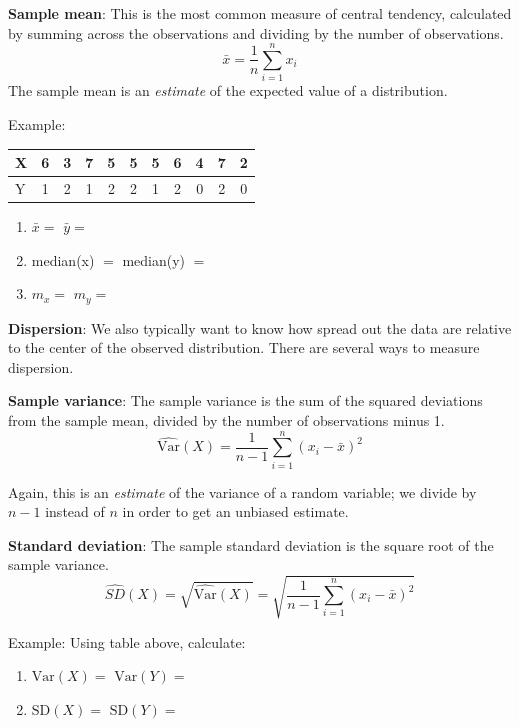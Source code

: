 \documentclass[
]{book}
\newcommand{\SD}{\mathrm{SD}}
\theoremstyle{definition}
\theoremstyle{definition}
\theoremstyle{definition}
\theoremstyle{definition}
\theoremstyle{remark}
\begin{document}
\textbf{Sample mean}: This is the most common measure of central tendency, calculated by summing across the observations and dividing by the number of observations.
\[\bar{x} = \frac{1}{n}\sum_{i=1}^{n}x_i\]
The sample mean is an \emph{estimate} of the expected value of a distribution.

\begin{framed}
Example:  
\begin{center}
\begin{tabular}{|l|cccccccccc|}
\hline
X & 6 & 3 & 7 & 5 & 5 & 5 & 6 & 4 & 7 & 2\\
\hline
Y & 1 & 2 & 1 & 2 & 2 & 1 & 2 & 0 & 2 & 0\\
\hline
\end{tabular}
\end{center}

\begin{enumerate}
\item $\bar{x} = $ \hspace{3.1cm} $\bar{y} = $
\item median(x) $ = $ \hspace{1.5cm} median(y) $ = $
\item $m_x = $ \hspace{2.75cm} $m_y =$\\
\end{enumerate}
\end{framed}

\textbf{Dispersion}: We also typically want to know how spread out the data are relative to the center of the observed distribution. There are several ways to measure dispersion.

\textbf{Sample variance}: The sample variance is the sum of the squared deviations from the sample mean, divided by the number of observations minus 1.
\[ \hat{\text{Var}}(X) = \frac{1}{n-1}\sum_{i = 1}^n (x_i - \bar{x})^2\]

Again, this is an \emph{estimate} of the variance of a random variable; we divide by \(n - 1\) instead of \(n\) in order to get an unbiased estimate.

\textbf{Standard deviation}: The sample standard deviation is the square root of the sample variance.
\[ \hat{SD}(X) = \sqrt{\hat{\text{Var}}(X)} = \sqrt{\frac{1}{n-1}\sum_{i = 1}^n (x_i - \bar{x})^2}\]

\begin{framed}
Example: Using table above, calculate: 
\begin{enumerate}
\item $\text{Var}(X) = $ \hspace{1.5cm} $\text{Var}(Y) =$
\item $\SD(X) = $ \hspace{1.65cm} $\SD(Y) =$
\end{enumerate}
\end{framed}
\end{document}
